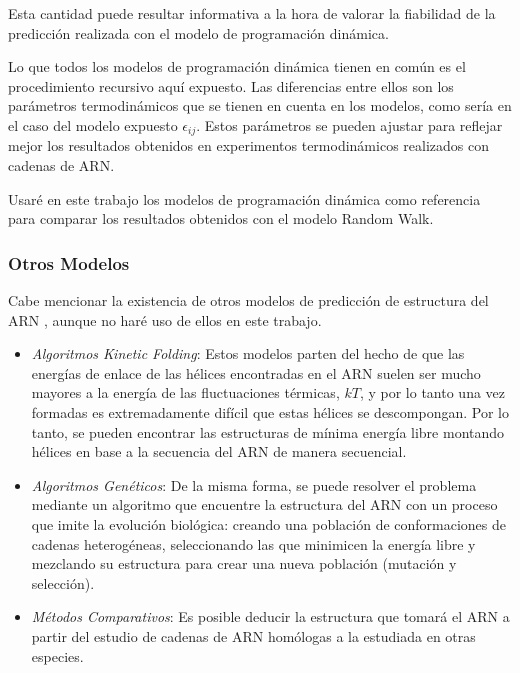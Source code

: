 \documentclass[a4paper,11pt,titlepage]{article}
\theoremstyle{definition}
\begin{document}
Esta cantidad puede resultar informativa a la hora de valorar la fiabilidad de la predicción realizada con el modelo de programación dinámica.

Lo que todos los modelos de programación dinámica tienen en común es el procedimiento recursivo aquí expuesto. Las diferencias entre ellos son los parámetros termodinámicos que se tienen en cuenta en los modelos, como sería en el caso del modelo expuesto $\epsilon_{ij}$. Estos parámetros se pueden ajustar para reflejar mejor los resultados obtenidos en experimentos termodinámicos realizados con cadenas de ARN.



Usaré en este trabajo los modelos de programación dinámica como referencia para comparar los resultados obtenidos con el modelo Random Walk.

\subsubsection{Otros Modelos}\label{subsubsec:others}

Cabe mencionar la existencia de otros modelos de predicción de estructura del ARN \cite{phiggs}, aunque no haré uso de ellos en este trabajo.

\begin{itemize}
    \item \textit{Algoritmos Kinetic Folding}: Estos modelos parten del hecho de que las energías de enlace de las hélices encontradas en el ARN suelen ser mucho mayores a la energía de las fluctuaciones térmicas, $kT$, y por lo tanto una vez formadas es extremadamente difícil que estas hélices se descompongan. Por lo tanto, se pueden encontrar las estructuras de mínima energía libre montando hélices en base a la secuencia del ARN de manera secuencial.
    \item \textit{Algoritmos Genéticos}: De la misma forma, se puede resolver el problema mediante un algoritmo que encuentre la estructura del ARN con un proceso que imite la evolución biológica: creando una población de conformaciones de cadenas heterogéneas, seleccionando las que minimicen la energía libre y mezclando su estructura para crear una nueva población (mutación y selección).
    \item \textit{Métodos Comparativos}: Es posible deducir la estructura que tomará el ARN a partir del estudio de cadenas de ARN homólogas a la estudiada en otras especies.
\end{itemize}
\end{document}
